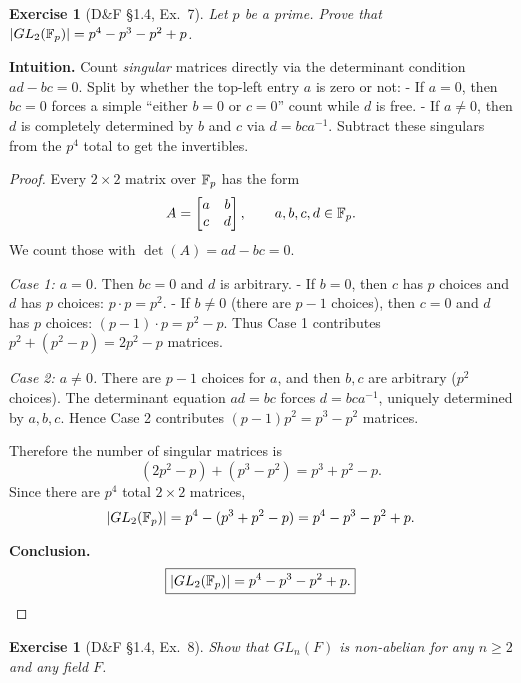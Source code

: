 \documentclass[12pt]{article}
\newtheorem{exercise}[theorem]{Exercise}
\theoremstyle{definition}
\begin{document}
\newpage

\begin{exercise}[D\&F §1.4, Ex.~7]
Let $p$ be a prime. Prove that $\lvert GL_2(\Bbb F_p)\rvert=p^4-p^3-p^2+p$.
\end{exercise}

\dotfill

\noindent\textbf{Intuition.}
Count \emph{singular} matrices directly via the determinant condition $ad-bc=0$.
Split by whether the top-left entry $a$ is zero or not:
- If $a=0$, then $bc=0$ forces a simple “either $b=0$ or $c=0$” count while $d$ is free.
- If $a\neq 0$, then $d$ is completely determined by $b$ and $c$ via $d=bca^{-1}$.
Subtract these singulars from the $p^4$ total to get the invertibles.

\dotfill

\begin{proof}
Every $2\times2$ matrix over $\Bbb F_p$ has the form
\[
A=\begin{bmatrix}a&b\\ c&d\end{bmatrix},\qquad a,b,c,d\in\Bbb F_p.
\]
We count those with $\det(A)=ad-bc=0$.

\emph{Case 1: $a=0$.} Then $bc=0$ and $d$ is arbitrary.
- If $b=0$, then $c$ has $p$ choices and $d$ has $p$ choices: $p\cdot p=p^2$.
- If $b\neq 0$ (there are $p-1$ choices), then $c=0$ and $d$ has $p$ choices:
  $(p-1)\cdot p=p^2-p$.
Thus Case 1 contributes $p^2+(p^2-p)=2p^2-p$ matrices.

\emph{Case 2: $a\neq 0$.} There are $p-1$ choices for $a$, and then $b,c$ are arbitrary
($p^2$ choices). The determinant equation $ad=bc$ forces $d=bca^{-1}$, uniquely
determined by $a,b,c$. Hence Case 2 contributes $(p-1)p^2=p^3-p^2$ matrices.

Therefore the number of singular matrices is
\[
(2p^2-p)+(p^3-p^2)=p^3+p^2-p.
\]
Since there are $p^4$ total $2\times2$ matrices,
\[
\lvert GL_2(\Bbb F_p)\rvert=p^4-(p^3+p^2-p)=p^4-p^3-p^2+p.
\]

\smallskip
\noindent\textbf{Conclusion.}
\[
\boxed{\lvert GL_2(\Bbb F_p)\rvert=p^4-p^3-p^2+p.}
\]
\end{proof}

\newpage

\begin{exercise}[D\&F §1.4, Ex.~8]
Show that $GL_n(F)$ is non-abelian for any $n\ge 2$ and any field $F$.
\end{exercise}
\end{document}
